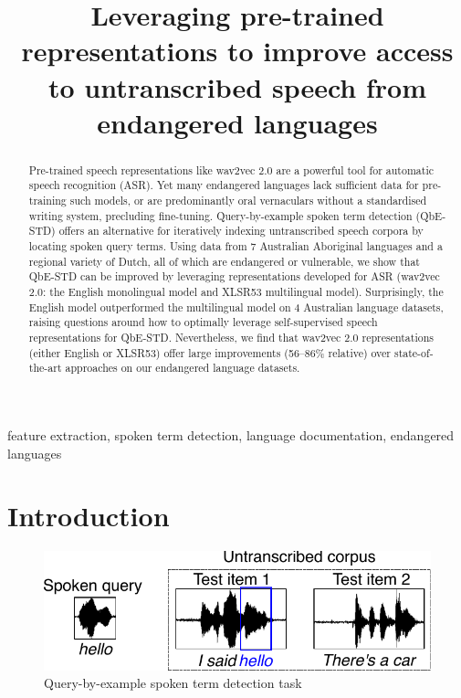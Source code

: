 \documentclass{article}
\title{Leveraging pre-trained representations to improve access to untranscribed speech from endangered languages}
\begin{document}
\maketitle


\begin{abstract}
Pre-trained speech representations like wav2vec 2.0 are a powerful tool for automatic speech recognition (ASR).
Yet many endangered languages lack sufficient data for pre-training such models, or are predominantly oral vernaculars without a standardised writing system, precluding fine-tuning.
Query-by-example spoken term detection (QbE-STD) offers an alternative for iteratively indexing untranscribed speech corpora by locating spoken query terms.
Using data from 7 Australian Aboriginal languages and a regional variety of Dutch, all of which are endangered or vulnerable, we show that QbE-STD can be improved by leveraging representations developed for ASR (wav2vec 2.0: the English monolingual model and XLSR53 multilingual model).
Surprisingly, the English model outperformed the multilingual model on 4 Australian language datasets, raising questions around how to optimally leverage self-supervised speech representations for QbE-STD.
Nevertheless, we find that wav2vec 2.0 representations (either English or XLSR53) offer large improvements (56--86\% relative) over state-of-the-art approaches on our endangered language datasets.
\end{abstract}

\begin{keywords}
feature extraction, spoken term detection, language documentation, endangered languages
\end{keywords}

\section{Introduction}
\label{sec:intro}

\begin{figure}[ht]
  \centering
  \includegraphics[width=0.76\linewidth]{qbestd.pdf}
  \caption{Query-by-example spoken term detection task}
  \label{fig:qbestd}
  \vspace{-1em}
\end{figure}
\end{document}
